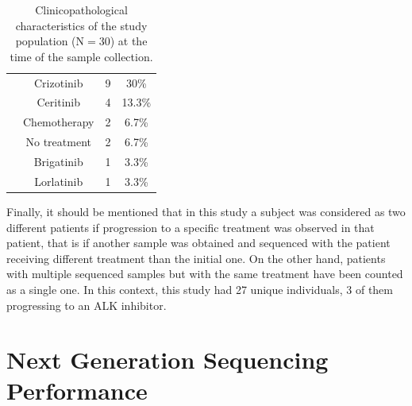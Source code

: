 \begin{table}[t]
{\begin{tabular}{cccc}
\rowcolor[HTML]{FFFFFF}
\cellcolor[HTML]{FFFFFF} & Crizotinib & 9 & 30\% \\
\rowcolor[HTML]{FFFFFF}
\cellcolor[HTML]{FFFFFF} & Ceritinib & 4 & 13.3\% \\
\rowcolor[HTML]{FFFFFF}
\cellcolor[HTML]{FFFFFF} & Chemotherapy & 2 & 6.7\% \\
\rowcolor[HTML]{FFFFFF}
\cellcolor[HTML]{FFFFFF} & No treatment & 2 & 6.7\% \\
\rowcolor[HTML]{FFFFFF}
\cellcolor[HTML]{FFFFFF} &  Brigatinib & 1 & 3.3\% \\
\rowcolor[HTML]{FFFFFF}
\multirow{-7}{*}{\cellcolor[HTML]{FFFFFF}\textbf{Treatment}} & Lorlatinib & 1 & 3.3\%
\end{tabular}}
\caption{Clinicopathological characteristics of the study population (N$=$30) at the time of the sample collection.}
\label{tab:Patients}
\end{table}

Finally, it should be mentioned that in this study a subject was considered as two different patients if progression to a specific treatment was observed in that patient, that is if another sample was obtained and sequenced with the patient receiving different treatment than the initial one. On the other hand, patients with multiple sequenced samples but with the same treatment have been counted as a single one. In this context, this study had 27 unique individuals, 3 of them progressing to an ALK inhibitor.

\section{Next Generation Sequencing Performance}


